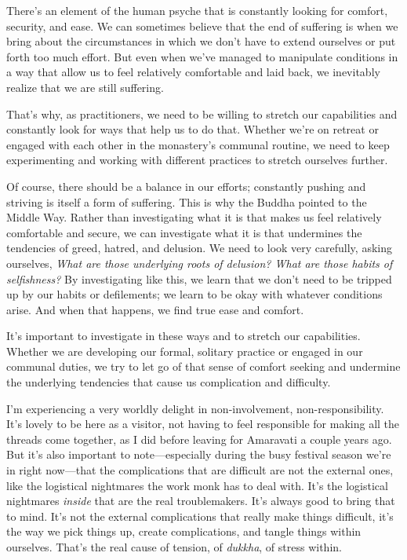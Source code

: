 
There's an element of the human psyche that is constantly looking for 
comfort, security, and ease. We can sometimes believe that the end of 
suffering is when we bring about the circumstances in which we don't 
have to extend ourselves or put forth too much effort. But even when 
we've managed to manipulate conditions in a way that allow us to feel 
relatively comfortable and laid back, we inevitably realize that we are 
still suffering.

That's why, as practitioners, we need to be willing to stretch our 
capabilities and constantly look for ways that help us to do that. 
Whether we're on retreat or engaged with each other in the monastery's 
communal routine, we need to keep experimenting and working with 
different practices to stretch ourselves further.

Of course, there should be a balance in our efforts; constantly pushing 
and striving is itself a form of suffering. This is why the Buddha 
pointed to the Middle Way. Rather than investigating what it is that 
makes us feel relatively comfortable and secure, we can investigate 
what it is that undermines the tendencies of greed, hatred, and 
delusion. We need to look very carefully, asking ourselves, \emph{What 
are those underlying roots of delusion? What are those habits of 
selfishness?} By investigating like this, we learn that we don't need 
to be tripped up by our habits or defilements; we learn to be okay with 
whatever conditions arise. And when that happens, we find true ease and 
comfort.

It's important to investigate in these ways and to stretch our 
capabilities. Whether we are developing our formal, solitary practice 
or engaged in our communal duties, we try to let go of that sense of 
comfort seeking and undermine the underlying tendencies that cause us 
complication and difficulty.


I'm experiencing a very worldly delight in non-involvement, 
non-responsibility. It's lovely to be here as a visitor, not having to 
feel responsible for making all the threads come together, as I did 
before leaving for Amaravati a couple years ago. But it's also 
important to note---especially during the busy festival season we're in 
right now---that the complications that are difficult are not the 
external ones, like the logistical nightmares the work monk has to deal 
with. It's the logistical nightmares \emph{inside} that are the real 
troublemakers. It's always good to bring that to mind. It's not the 
external complications that really make things difficult, it's the way 
we pick things up, create complications, and tangle things within 
ourselves. That's the real cause of tension, of \emph{dukkha}, of 
stress within.

